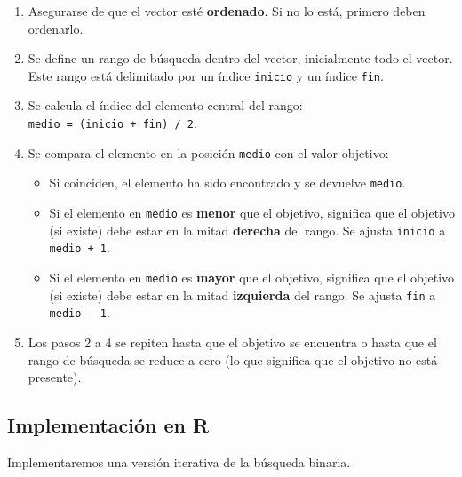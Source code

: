 \documentclass[
  spanish,
  letterpaper,
  DIV=11,
  numbers=noendperiod]{scrreprt}
\providecommand{\tightlist}{%
  \setlength{\itemsep}{0pt}\setlength{\parskip}{0pt}}
\begin{document}
\begin{enumerate}
\def\labelenumi{\arabic{enumi}.}
\tightlist
\item
  Asegurarse de que el vector esté \textbf{ordenado}. Si no lo está,
  primero deben ordenarlo.
\item
  Se define un rango de búsqueda dentro del vector, inicialmente todo el
  vector. Este rango está delimitado por un índice \texttt{inicio} y un
  índice \texttt{fin}.
\item
  Se calcula el índice del elemento central del rango:
  \texttt{medio\ =\ (inicio\ +\ fin)\ /\ 2}.
\item
  Se compara el elemento en la posición \texttt{medio} con el valor
  objetivo:

  \begin{itemize}
  \tightlist
  \item
    Si coinciden, el elemento ha sido encontrado y se devuelve
    \texttt{medio}.
  \item
    Si el elemento en \texttt{medio} es \textbf{menor} que el objetivo,
    significa que el objetivo (si existe) debe estar en la mitad
    \textbf{derecha} del rango. Se ajusta \texttt{inicio} a
    \texttt{medio\ +\ 1}.
  \item
    Si el elemento en \texttt{medio} es \textbf{mayor} que el objetivo,
    significa que el objetivo (si existe) debe estar en la mitad
    \textbf{izquierda} del rango. Se ajusta \texttt{fin} a
    \texttt{medio\ -\ 1}.
  \end{itemize}
\item
  Los pasos 2 a 4 se repiten hasta que el objetivo se encuentra o hasta
  que el rango de búsqueda se reduce a cero (lo que significa que el
  objetivo no está presente).
\end{enumerate}

\subsection{Implementación en R}\label{implementaciuxf3n-en-r-1}

Implementaremos una versión iterativa de la búsqueda binaria.
\end{document}
